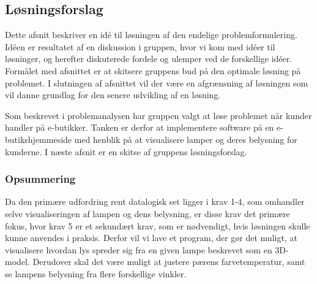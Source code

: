 \subsection{Løsningsforslag}
\label{sec:losning}
Dette afsnit beskriver en idé til løsningen af den endelige problemformulering. Idéen er resultatet af en diskussion i gruppen, hvor vi kom med idéer til løsninger, og herefter diskuterede fordele og ulemper ved de forskellige idéer. Formålet med afsnittet er at skitsere gruppens bud på den optimale løsning på problemet. I slutningen af afsnittet vil der være en afgrænsning af løsningen som vil danne grundlag for den senere udvikling af en løsning.

Som beskrevet i problemanalysen har gruppen valgt at løse problemet når kunder handler på e-butikker. Tanken er derfor at implementere software på en e-butikshjemmeside med henblik på at visualisere lamper og deres belysning for kunderne. I næste afsnit er en skitse af gruppens løsningsforslag.





\subsubsection*{Opsummering}

Da den primære udfordring rent datalogisk set ligger i krav 1-4, som omhandler selve visualiseringen af lampen og dens belysning, er disse krav det primære fokus, hvor krav 5 er et sekundært krav, som er nødvendigt, hvis løsningen skulle kunne anvendes i praksis. Derfor vil vi lave et program, der gør det muligt, at visualisere hvordan lys spreder sig fra en given lampe beskrevet som en 3D-model. Derudover skal det være muligt at justere pærens farvetemperatur, samt se lampens belysning fra flere forskellige vinkler. 